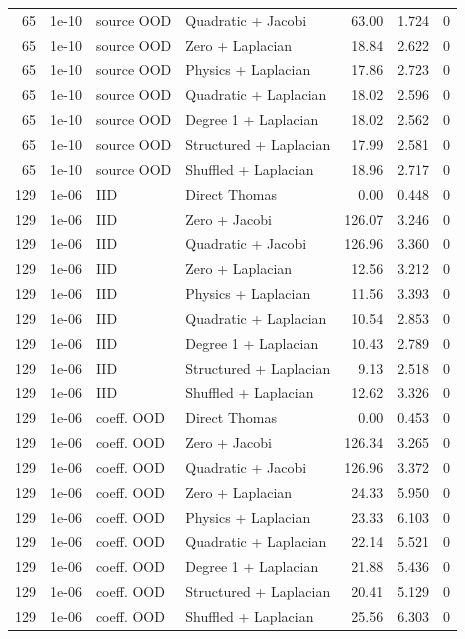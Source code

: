 \begin{longtable}{rlllrrr}
65 & 1e-10 & source OOD & Quadratic + Jacobi & 63.00 & 1.724 & 0 \\
65 & 1e-10 & source OOD & Zero + Laplacian & 18.84 & 2.622 & 0 \\
65 & 1e-10 & source OOD & Physics + Laplacian & 17.86 & 2.723 & 0 \\
65 & 1e-10 & source OOD & Quadratic + Laplacian & 18.02 & 2.596 & 0 \\
65 & 1e-10 & source OOD & Degree 1 + Laplacian & 18.02 & 2.562 & 0 \\
65 & 1e-10 & source OOD & Structured + Laplacian & 17.99 & 2.581 & 0 \\
65 & 1e-10 & source OOD & Shuffled + Laplacian & 18.96 & 2.717 & 0 \\
129 & 1e-06 & IID & Direct Thomas & 0.00 & 0.448 & 0 \\
129 & 1e-06 & IID & Zero + Jacobi & 126.07 & 3.246 & 0 \\
129 & 1e-06 & IID & Quadratic + Jacobi & 126.96 & 3.360 & 0 \\
129 & 1e-06 & IID & Zero + Laplacian & 12.56 & 3.212 & 0 \\
129 & 1e-06 & IID & Physics + Laplacian & 11.56 & 3.393 & 0 \\
129 & 1e-06 & IID & Quadratic + Laplacian & 10.54 & 2.853 & 0 \\
129 & 1e-06 & IID & Degree 1 + Laplacian & 10.43 & 2.789 & 0 \\
129 & 1e-06 & IID & Structured + Laplacian & 9.13 & 2.518 & 0 \\
129 & 1e-06 & IID & Shuffled + Laplacian & 12.62 & 3.326 & 0 \\
129 & 1e-06 & coeff. OOD & Direct Thomas & 0.00 & 0.453 & 0 \\
129 & 1e-06 & coeff. OOD & Zero + Jacobi & 126.34 & 3.265 & 0 \\
129 & 1e-06 & coeff. OOD & Quadratic + Jacobi & 126.96 & 3.372 & 0 \\
129 & 1e-06 & coeff. OOD & Zero + Laplacian & 24.33 & 5.950 & 0 \\
129 & 1e-06 & coeff. OOD & Physics + Laplacian & 23.33 & 6.103 & 0 \\
129 & 1e-06 & coeff. OOD & Quadratic + Laplacian & 22.14 & 5.521 & 0 \\
129 & 1e-06 & coeff. OOD & Degree 1 + Laplacian & 21.88 & 5.436 & 0 \\
129 & 1e-06 & coeff. OOD & Structured + Laplacian & 20.41 & 5.129 & 0 \\
129 & 1e-06 & coeff. OOD & Shuffled + Laplacian & 25.56 & 6.303 & 0 \\

\end{longtable}
